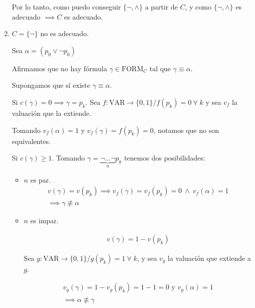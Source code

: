 \begin{enumerate}
        Por lo tanto, como puedo conseguir $\{ \neg, \wedge \}$ a partir de
        $C$, y como $\{ \neg, \wedge \}$ es adecuado
        $\implies C$ es adecuado.

    \item $C = \{ \neg \}$ no es adecuado.

        Sea $\alpha = (p_0 \vee \neg p_0)$

        Afirmamos que no hay fórmula $\gamma \in \mathrm{FORM}_C$ tal que
        $\gamma \equiv \alpha$.

        Supongamos que sí existe $\gamma \equiv \alpha$.

        Si $c(\gamma) = 0 \implies \gamma = p_k$.
        Sea $f: \mathrm{VAR} \to \{ 0, 1 \} / f(p_k) = 0 ~ \forall \; k$ y
        sea $v_f$ la valuación que la extiende.

        Tomando $v_f (\alpha) = 1$ y $v_f (\gamma) = f(p_k) = 0$, notamos que
        no son equivalentes.
    
        Si $c(\gamma) \geq 1$. 
        Tomando $\gamma = \underbrace{\neg \dots \neg}_{n} p_k$ tenemos
        dos posibilidades:
        \begin{itemize}
            \item $n$ es par.
                \begin{gather*}
                    v(\gamma) = v(p_k) 
                    \implies 
                    v_f(\gamma) = v_f(p_k) = 0 
                    ~ \wedge ~
                    v_f(\alpha) = 1 \\
                    \implies \gamma \not\equiv \alpha
                \end{gather*}
            \item $n$ es impar.

                \begin{gather*}
                    v(\gamma) = 1 - v(p_k) 
                \end{gather*}

                Sea 
                $g: \mathrm{VAR} \to \{ 0, 1 \} / g(p_k) = 1 ~ \forall \; k$,
                y sea $v_g$ la valuación que extiende a $g$.

                \begin{gather*}
                    v_g(\gamma) = 1 - v_g(p_k) = 1 - 1 = 0 
                    \text{ y }
                    v_g(\alpha) = 1 \\
                    \implies \alpha \not\equiv \gamma
                \end{gather*}
        \end{itemize}
\end{enumerate}

